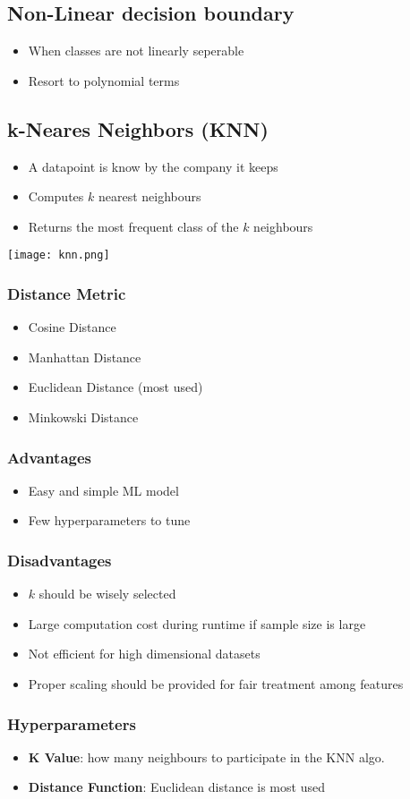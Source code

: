 \subsection{Non-Linear decision boundary}
\begin{itemize}
    \item When classes are not linearly seperable
    \item Resort to polynomial terms
\end{itemize}

\subsection{k-Neares Neighbors (KNN)}
\begin{itemize}
    \item A datapoint is know by the company it keeps
    \item Computes $k$ nearest neighbours
    \item Returns the most frequent class of the $k$ neighbours
\end{itemize}
\texttt{[image: knn.png]}
\subsubsection{Distance Metric}
\begin{itemize}
    \item Cosine Distance
    \item Manhattan Distance
    \item Euclidean Distance (most used)
    \item Minkowski Distance
\end{itemize}
\subsubsection{Advantages}
\begin{itemize}
    \item Easy and simple ML model
    \item Few hyperparameters to tune
\end{itemize}

\subsubsection{Disadvantages}
\begin{itemize}
    \item $k$ should be wisely selected
    \item Large computation cost during runtime if sample size is large
    \item Not efficient for high dimensional datasets
    \item Proper scaling should be provided for fair treatment among features
\end{itemize}

\subsubsection{Hyperparameters}
\begin{itemize}
    \item \textbf{K Value}: how many neighbours to participate in the KNN algo.
    \item \textbf{Distance Function}: Euclidean distance is most used
\end{itemize}
